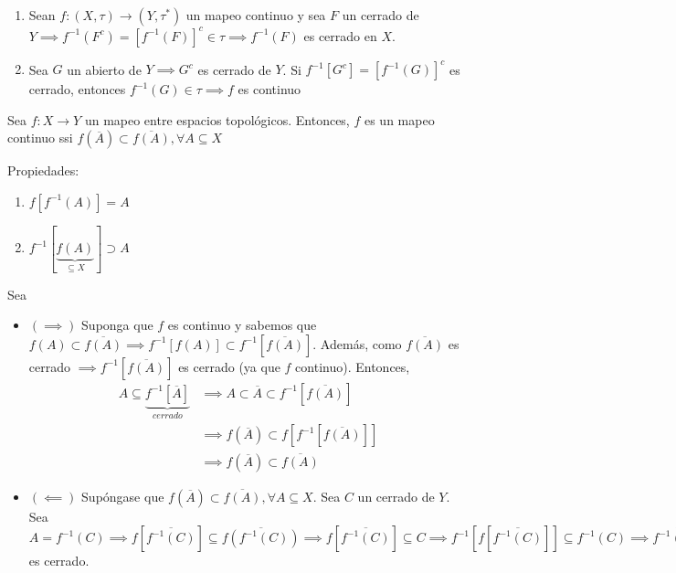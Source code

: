 \begin{nota}
    \begin{enumerate}
        \item Sean $f:(X,\tau)\to(Y,\tau^*)$ un mapeo continuo y sea $F$ un cerrado de $Y\implies f^{-1}(F^c)=\left[f^{-1}(F)\right]^c\in \tau \implies f^{-1}(F)$ es cerrado en $X$.  
        \item Sea $G$ un abierto de $Y\implies G^c$ es cerrado de $Y$. Si $f^{-1}[G^c]=[f^{-1}(G)]^c$ es cerrado, entonces $f^{-1}(G)\in \tau\implies f$ es continuo 
    \end{enumerate}
    
\end{nota}


\begin{prop}
    Sea $f:X\to Y$ un mapeo entre espacios topológicos. Entonces, $f$ es un mapeo continuo ssi $f(\overline{A})\subset \overline{f(A)},\forall A\subseteq X$
    \begin{cajita}
        Propiedades: 
        \begin{enumerate}
            \item $f[f^{-1}(A)]=A$
            \item $f^{-1}[\underbrace{f(A)}_{\subseteq X}]\supset A$
        \end{enumerate}
    \end{cajita}
    \begin{dem}
        Sea
        \begin{itemize}
            \item $(\implies )$ Suponga que $f$ es continuo y sabemos que $f(A)\subset \overline{f(A)}\implies f^{-1}[f(A)]\subset f^{-1}[\overline{f(A)}]$. Además, como $\overline{f(A)}$ es cerrado $\implies f^{-1}[\overline{f(A)}]$ es cerrado (ya que $f$ continuo). Entonces, 
            \begin{align*}
                A\subseteq \underbrace{f^{-1}[\overline{A}]}_{cerrado} &\implies A\subset \overline{A}\subset f^{-1}[\overline{f(A)}]\\
                &\implies f(\overline{A})\subset f[f^{-1}[\overline{f(A)}]]\\
                &\implies f(\overline{A})\subset \overline{f(A)}
            \end{align*}
            \item $(\impliedby)$ Supóngase que $f(\overline{A})\subset \overline{f(A)},\forall A\subseteq X$. Sea $C$ un cerrado de $Y$. Sea $A=f^{-1}(C)\implies f[\overline{f^{-1}(C)}]\subseteq \overline{f(f^{-1}(C))}\implies f[\overline{f^{-1}(C)}]\subseteq C\implies f^{-1}[f[\overline{f^{-1}(C)}]]\subseteq f^{-1}(C)\implies \overline{f^{-1}(C)}\subset f^{-1}(C)\implies f^{-1}(C)\subset \overline{f^{-1}(C)}\subset f^{-1}(C)\implies f^{-1}(C)=\overline{f^{-1}(C)}\implies f^{-1}(C)$ es cerrado. 
        \end{itemize}
    \end{dem}
\end{prop}

